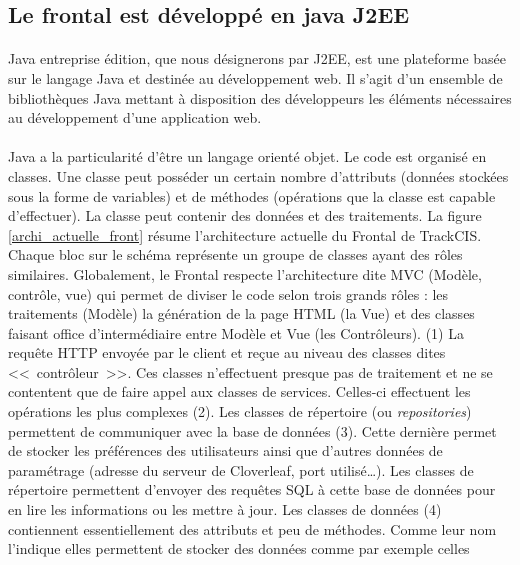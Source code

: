 		\subsection{Le frontal est développé en java J2EE}
			\paragraph{}%
			Java entreprise édition, que nous désignerons par J2EE, est une
			plateforme basée sur le langage Java et destinée au développement web. Il
			s'agit d'un ensemble de bibliothèques Java mettant à disposition des
			développeurs les éléments nécessaires au développement d'une application
			web.
			
			\paragraph{}
			Java a la particularité d'être un langage orienté objet. Le code est organisé
			en classes. Une classe peut posséder un certain nombre d'attributs
			(données stockées sous la forme de variables) et de méthodes (opérations
			que la classe est capable d'effectuer). La classe peut contenir des données
			et des traitements. La figure \ref{archi_actuelle_front} résume
			l'architecture actuelle du Frontal de TrackCIS. Chaque bloc sur le schéma représente un
			groupe de classes ayant des rôles similaires. Globalement, le Frontal
			respecte l'architecture dite MVC (Modèle, contrôle, vue) qui permet de
			diviser le code selon trois grands rôles : les traitements (Modèle) la
			génération de la page HTML (la Vue) et des classes faisant office
			d'intermédiaire entre Modèle et Vue (les Contrôleurs). (1) La requête HTTP
			envoyée par le client et reçue au niveau des classes dites <<~contrôleur~>>.
			Ces classes n'effectuent presque pas de traitement et ne se contentent que de
			faire appel aux classes de services.
			Celles-ci effectuent les opérations les plus complexes (2). Les classes de
			répertoire (ou \textit{repositories}) permettent de communiquer avec la base
			de données (3).
			Cette dernière permet de stocker les préférences des utilisateurs ainsi que
			d'autres données de paramétrage (adresse du serveur de
			Cloverleaf, port utilisé\ldots). Les classes de répertoire permettent
			d'envoyer des requêtes SQL à cette base de données pour en lire les
			informations ou les mettre à jour. Les classes de données (4) contiennent
			essentiellement des attributs et peu de méthodes. Comme leur nom
			l'indique elles permettent de stocker des données comme par exemple celles
